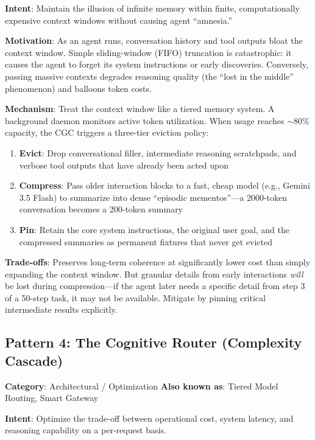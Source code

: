 \textbf{Intent}: Maintain the illusion of infinite memory within finite, computationally expensive context windows without causing agent ``amnesia.''

\textbf{Motivation}: As an agent runs, conversation history and tool outputs bloat the context window. Simple sliding-window (FIFO) truncation is catastrophic: it causes the agent to forget its system instructions or early discoveries. Conversely, passing massive contexts degrades reasoning quality (the ``lost in the middle'' phenomenon) and balloons token costs.

\textbf{Mechanism}: Treat the context window like a tiered memory system. A background daemon monitors active token utilization. When usage reaches $\sim$80\% capacity, the CGC triggers a three-tier eviction policy:

\begin{enumerate}[leftmargin=*]
    \item \textbf{Evict}: Drop conversational filler, intermediate reasoning scratchpads, and verbose tool outputs that have already been acted upon
    \item \textbf{Compress}: Pass older interaction blocks to a fast, cheap model (e.g., Gemini 3.5 Flash) to summarize into dense ``episodic mementos''---a 2000-token conversation becomes a 200-token summary
    \item \textbf{Pin}: Retain the core system instructions, the original user goal, and the compressed summaries as permanent fixtures that never get evicted
\end{enumerate}

\textbf{Trade-offs}: Preserves long-term coherence at significantly lower cost than simply expanding the context window. But granular details from early interactions \emph{will} be lost during compression---if the agent later needs a specific detail from step 3 of a 50-step task, it may not be available. Mitigate by pinning critical intermediate results explicitly.


\subsection{Pattern 4: The Cognitive Router (Complexity Cascade)}

\textbf{Category}: Architectural / Optimization \hfill \textbf{Also known as}: Tiered Model Routing, Smart Gateway

\textbf{Intent}: Optimize the trade-off between operational cost, system latency, and reasoning capability on a per-request basis.

